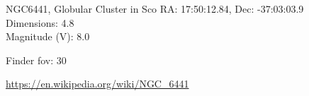 \begin{block}{NGC6441, Globular Cluster in Sco}
    RA: 17:50:12.84, Dec: -37:03:03.9 \\ 
    Dimensions: 4.8 \\ 
    Magnitude (V): 8.0



    Finder fov: 30 

    \url{https://en.wikipedia.org/wiki/NGC_6441} 
\end{block}